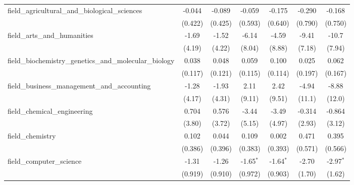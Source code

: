 \begin{tabular}{lcccccc}
   field\_agricultural\_and\_biological\_sciences              & -0.044        & -0.089        & -0.059        & -0.175        & -0.290       & -0.168\\   
                                                               & (0.422)       & (0.425)       & (0.593)       & (0.640)       & (0.790)      & (0.750)\\   
   field\_arts\_and\_humanities                                & -1.69         & -1.52         & -6.14         & -4.59         & -9.41        & -10.7\\   
                                                               & (4.19)        & (4.22)        & (8.04)        & (8.88)        & (7.18)       & (7.94)\\   
   field\_biochemistry\_genetics\_and\_molecular\_biology      & 0.038         & 0.048         & 0.059         & 0.100         & 0.025        & 0.062\\   
                                                               & (0.117)       & (0.121)       & (0.115)       & (0.114)       & (0.197)      & (0.167)\\   
   field\_business\_management\_and\_accounting                & -1.28         & -1.93         & 2.11          & 2.42          & -4.94        & -8.88\\   
                                                               & (4.17)        & (4.31)        & (9.11)        & (9.51)        & (11.1)       & (12.0)\\   
   field\_chemical\_engineering                                & 0.704         & 0.576         & -3.44         & -3.49         & -0.314       & -0.864\\   
                                                               & (3.80)        & (3.72)        & (5.15)        & (4.97)        & (2.93)       & (3.12)\\   
   field\_chemistry                                            & 0.102         & 0.044         & 0.109         & 0.002         & 0.471        & 0.395\\   
                                                               & (0.386)       & (0.396)       & (0.383)       & (0.393)       & (0.571)      & (0.566)\\   
   field\_computer\_science                                    & -1.31         & -1.26         & -1.65$^{*}$   & -1.64$^{*}$   & -2.70        & -2.97$^{*}$\\   
                                                               & (0.919)       & (0.910)       & (0.972)       & (0.903)       & (1.70)       & (1.62)\\   

\end{tabular}
